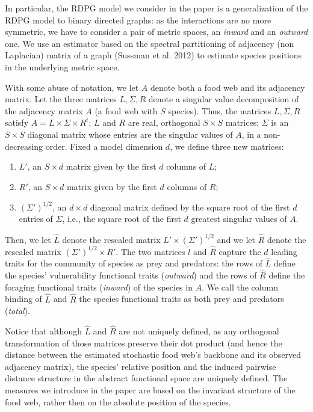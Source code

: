 \documentclass[11pt,article,oneside]{memoir}
\begin{document}
In particular, the RDPG model we consider in the paper is a
generalization of the RDPG model to binary directed graphs: as the
interactions are no more symmetric, we have to consider a pair of metric
spaces, an \emph{inward} and an \emph{outward} one. We use an estimator
based on the spectral partitioning of adjacency (non Laplacian) matrix
of a graph (Sussman et al. 2012) to estimate species positions in the
underlying metric space.

With some abuse of notation, we let \(A\) denote both a food web and its
adjacency matrix. Let the three matrices \(L, \Sigma, R\) denote a
singular value decomposition of the adjacency matrix \(A\) (a food web
with \(S\) species). Thus, the matrices \(L, \Sigma, R\) satisfy
\(A = L \times \Sigma \times R^t\); \(L\) and \(R\) are real, orthogonal
\(S \times S\) matrices; \(\Sigma\) is an \(S \times S\) diagonal matrix
whose entries are the singular values of \(A\), in a non-decreasing
order. Fixed a model dimension \(d\), we define three new matrices:

\begin{enumerate}
\def\labelenumi{\arabic{enumi}.}
\tightlist
\item
  \(L'\), an \(S \times d\) matrix given by the first \(d\) columns of
  \(L\);
\item
  \(R'\), an \(S \times d\) matrix given by the first \(d\) columns of
  \(R\);
\item
  \(\left(\Sigma'\right)^{1/2}\), an \(d \times d\) diagonal matrix
  defined by the square root of the first \(d\) entries of \(\Sigma\),
  i.e., the square root of the first \(d\) greatest singular values of
  \(A\).
\end{enumerate}

Then, we let \(\hat{L}\) denote the rescaled matrix
\(L' \times \left( \Sigma'\right)^{1/2}\) and we let \(\hat{R}\) denote
the rescaled matrix \(\left( \Sigma'\right)^{1/2} \times R'\). The two
matrices \(\hat{l}\) and \(\hat{R}\) capture the \(d\) leading traits
for the community of species as prey and predators: the rows of
\(\hat{L}\) define the species' vulnerability functional traits
(\emph{outward}) and the rows of \(\hat{R}\) define the foraging
functional traits (\emph{inward}) of the species in \(A\). We call the
column binding of \(\hat{L}\) and \(\hat{R}\) the species functional
traits as both prey and predators (\emph{total}).

Notice that although \(\hat{L}\) and \(\hat{R}\) are not uniquely
defined, as any orthogonal transformation of those matrices preserve
their dot product (and hence the distance between the estimated
stochastic food web's backbone and its observed adjacency matrix), the
species' relative position and the induced pairwise distance structure
in the abstract functional space are uniquely defined. The measures we
introduce in the paper are based on the invariant structure of the food
web, rather then on the absolute position of the species.
\end{document}
